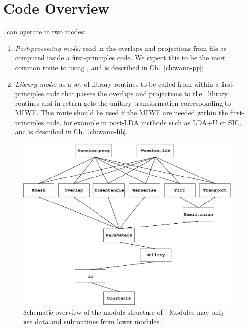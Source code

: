 \chapter{Code Overview}
\wannier\ can operate in two modes:

\begin{enumerate}
\item {\it Post-processing mode:} read in the overlaps and projections
  from file as computed inside a first-principles code. We expect this
  to be the most common route to using \wannier, and is described in
  Ch.~\ref{ch:wann-pp};


\item {\it Library mode:} as a set of library routines to be called
  from within a first-principles code that passes the overlaps and
  projections to the \wannier\ library routines and in return gets the
  unitary transformation corresponding to MLWF. This route should be
  used if the MLWF are needed within the first-principles code, for
  example in post-LDA methods such as LDA+U or SIC, and is described
  in Ch.~\ref{ch:wann-lib}.
\end{enumerate}


\begin{figure}
\begin{center}
\includegraphics[width=5in]{overview.eps}
\caption{Schematic overview of the module structure of
  \wannier. Modules may only use data and subroutines from lower
  modules.}
\label{structure}
\end{center}
\end{figure}

